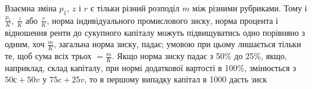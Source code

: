 Взаємна зміна $p_1$, $z$ і $r$ є тільки різний розподіл $m$ між різними
рубриками. Тому і $\frac{p_1}{K}$, $\frac{z}{K}$ або $\frac{r}{K}$, норма індивідуального
промислового зиску, норма процента і відношення ренти до
сукупного капіталу можуть підвищуватись одно порівняно з одним,
хоч $\frac{m}{K}$, загальна норма зиску, падає; умовою при цьому
лишається тільки те, щоб сума всіх трьох $= \frac{m}{K}$. Якщо норма
зиску падає з 50\% до 25\%, якщо, наприклад, склад капіталу,
при нормі додаткової вартості в 100\%, змінюється з $50 с + 50 v$
у $75 c + 25 v$, то в першому випадку капітал в 1000 дасть зиск
\parbreak{}  %
